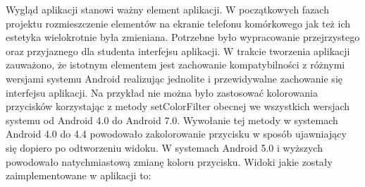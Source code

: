 \documentclass{report}
\begin{document}
		Wygląd aplikacji stanowi ważny element aplikacji. W początkowych fazach projektu rozmieszczenie elementów na ekranie telefonu komórkowego jak też ich estetyka wielokrotnie była zmieniana. Potrzebne było wypracowanie przejrzystego oraz przyjaznego dla studenta interfejsu aplikacji. W trakcie tworzenia aplikacji zauważono, że istotnym elementem jest zachowanie kompatybilności z różnymi wersjami systemu Android realizując jednolite i przewidywalne zachowanie się interfejsu aplikacji.
		Na przykład nie można było zastosować kolorowania przycisków korzystając z metody setColorFilter obecnej we wszystkich wersjach systemu od Android 4.0 do Android 7.0. Wywołanie tej metody w systemach Android 4.0 do 4.4 powodowało zakolorowanie przycisku w sposób ujawniający się dopiero po odtworzeniu widoku. W systemach Android 5.0 i wyższych powodowało natychmiastową zmianę koloru przycisku.
		Widoki jakie zostały zaimplementowane w aplikacji to:
\end{document}

